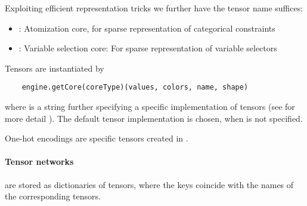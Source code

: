 Exploiting efficient representation tricks we further have the tensor name suffices:
\begin{itemize}
    \item \atoCoreSuf: Atomization core, for sparse representation of categorical constraints
    \item \vselCoreSuf: Variable selection core: For sparse representation of variable selectors
\end{itemize}

Tensors are instantiated by
\begin{lstlisting}
	engine.getCore(coreType)(values, colors, name, shape)
\end{lstlisting}
where  is a string further specifying a specific implementation of tensors (see for more detail ).
The default tensor implementation  is chosen, when  is not specified.


One-hot encodings are specific tensors created in \sprepresentation.

\subsect{\bncontractions}

\paragraph{Tensor networks} are stored as dictionaries of tensors, where the keys coincide with the names of the corresponding tensors.

